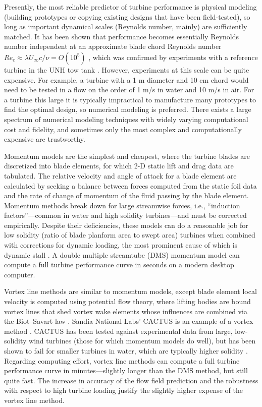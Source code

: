 Presently, the most reliable predictor of turbine performance is physical
modeling (building prototypes or copying existing designs that have been
field-tested), so long as important dynamical scales (Reynolds number, mainly)
are sufficiently matched. It has been shown that performance becomes essentially
Reynolds number independent at an approximate blade chord Reynolds number $Re_c
\approx \lambda U_\infty c / \nu = O(10^5)$ \cite{Bravo2007}, which was
confirmed by experiments with a reference turbine in the UNH tow tank
\cite{Bachant2014}. However, experiments at this scale can be quite expensive.
For example, a turbine with a 1 m diameter and 10 cm chord would need to be
tested in a flow on the order of 1 m/s in water and 10 m/s in air. For a turbine
this large it is typically impractical to manufacture many prototypes to find
the optimal design, so numerical modeling is preferred. There exists a large
spectrum of numerical modeling techniques with widely varying computational cost
and fidelity, and sometimes only the most complex and computationally expensive
are trustworthy.

Momentum models are the simplest and cheapest, where the turbine blades are
discretized into blade elements, for which 2-D static lift and drag data are
tabulated. The relative velocity and angle of attack for a blade element are
calculated by seeking a balance between forces computed from the static foil
data and the rate of change of momentum of the fluid passing by the blade
element. Momentum methods break down for large streamwise forces, i.e.,
``induction factors''---common in water and high solidity turbines---and must be
corrected empirically. Despite their deficiencies, these models can do a
reasonable job for low solidity (ratio of blade planform area to swept area)
turbines when combined with corrections for dynamic loading, the most prominent
cause of which is dynamic stall \cite{Para2002}. A double multiple streamtube
(DMS) momentum model can compute a full turbine performance curve in seconds on
a modern desktop computer.

Vortex line methods are similar to momentum models, except blade element local
velocity is computed using potential flow theory, where lifting bodies are bound
vortex lines that shed vortex wake elements whose influences are combined via
the Biot--Savart law \cite{Strickland1979}. Sandia National Labs' CACTUS is an
example of a vortex method \cite{Murray2011}. CACTUS has been tested against
experimental data from large, low-solidity wind turbines (those for which
momentum models do well), but has been shown to fail for smaller turbines in
water, which are typically higher solidity \cite{Michelen2014}. Regarding
computing effort, vortex line methods can compute a full turbine performance
curve in minutes---slightly longer than the DMS method, but still quite fast.
The increase in accuracy of the flow field prediction and the robustness with
respect to high turbine loading justify the slightly higher expense of the
vortex line method.

